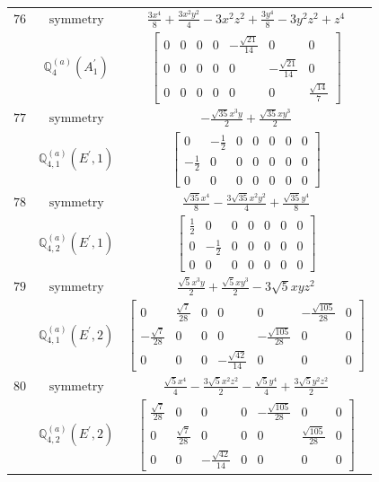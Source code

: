 \documentclass[fleqn,8pt,landscape]{jsarticle}
\begin{document}
\begin{longtable}{ccc}
$ 76 $ & $ \text{symmetry} $ & $ \frac{3 x^{4}}{8} + \frac{3 x^{2} y^{2}}{4} - 3 x^{2} z^{2} + \frac{3 y^{4}}{8} - 3 y^{2} z^{2} + z^{4} $ \\
$  $ & $ \mathbb{Q}_{4}^{(a)}(A_{1}^{\prime}) $ & $ \begin{bmatrix} 0 & 0 & 0 & 0 & - \frac{\sqrt{21}}{14} & 0 & 0 \\ 0 & 0 & 0 & 0 & 0 & - \frac{\sqrt{21}}{14} & 0 \\ 0 & 0 & 0 & 0 & 0 & 0 & \frac{\sqrt{14}}{7} \end{bmatrix} $ \\ \hline
$ 77 $ & $ \text{symmetry} $ & $ - \frac{\sqrt{35} x^{3} y}{2} + \frac{\sqrt{35} x y^{3}}{2} $ \\
$  $ & $ \mathbb{Q}_{4,1}^{(a)}(E^{\prime},1) $ & $ \begin{bmatrix} 0 & - \frac{1}{2} & 0 & 0 & 0 & 0 & 0 \\ - \frac{1}{2} & 0 & 0 & 0 & 0 & 0 & 0 \\ 0 & 0 & 0 & 0 & 0 & 0 & 0 \end{bmatrix} $ \\ \hline
$ 78 $ & $ \text{symmetry} $ & $ \frac{\sqrt{35} x^{4}}{8} - \frac{3 \sqrt{35} x^{2} y^{2}}{4} + \frac{\sqrt{35} y^{4}}{8} $ \\
$  $ & $ \mathbb{Q}_{4,2}^{(a)}(E^{\prime},1) $ & $ \begin{bmatrix} \frac{1}{2} & 0 & 0 & 0 & 0 & 0 & 0 \\ 0 & - \frac{1}{2} & 0 & 0 & 0 & 0 & 0 \\ 0 & 0 & 0 & 0 & 0 & 0 & 0 \end{bmatrix} $ \\ \hline
$ 79 $ & $ \text{symmetry} $ & $ \frac{\sqrt{5} x^{3} y}{2} + \frac{\sqrt{5} x y^{3}}{2} - 3 \sqrt{5} x y z^{2} $ \\
$  $ & $ \mathbb{Q}_{4,1}^{(a)}(E^{\prime},2) $ & $ \begin{bmatrix} 0 & \frac{\sqrt{7}}{28} & 0 & 0 & 0 & - \frac{\sqrt{105}}{28} & 0 \\ - \frac{\sqrt{7}}{28} & 0 & 0 & 0 & - \frac{\sqrt{105}}{28} & 0 & 0 \\ 0 & 0 & 0 & - \frac{\sqrt{42}}{14} & 0 & 0 & 0 \end{bmatrix} $ \\ \hline
$ 80 $ & $ \text{symmetry} $ & $ \frac{\sqrt{5} x^{4}}{4} - \frac{3 \sqrt{5} x^{2} z^{2}}{2} - \frac{\sqrt{5} y^{4}}{4} + \frac{3 \sqrt{5} y^{2} z^{2}}{2} $ \\
$  $ & $ \mathbb{Q}_{4,2}^{(a)}(E^{\prime},2) $ & $ \begin{bmatrix} \frac{\sqrt{7}}{28} & 0 & 0 & 0 & - \frac{\sqrt{105}}{28} & 0 & 0 \\ 0 & \frac{\sqrt{7}}{28} & 0 & 0 & 0 & \frac{\sqrt{105}}{28} & 0 \\ 0 & 0 & - \frac{\sqrt{42}}{14} & 0 & 0 & 0 & 0 \end{bmatrix} $ \\ \hline

\end{longtable}
\end{document}
